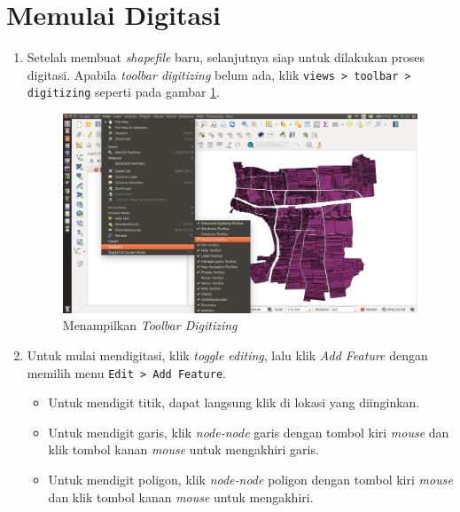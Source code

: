 \section{Memulai Digitasi}

\begin{enumerate}[1.]

  \item Setelah membuat \textit{shapefile} baru, selanjutnya siap untuk dilakukan proses digitasi. Apabila \textit{toolbar digitizing} belum ada, klik \texttt{views > toolbar > digitizing} seperti pada gambar \ref{fig:showdigitizingtoolbar}.
  
  \begin{figure}[H]
    \centering
    \includegraphics[width=1\textwidth]{./resources/049-show-digitizing-toolbar}
    \caption{Menampilkan \textit{Toolbar Digitizing}}
    \label{fig:showdigitizingtoolbar}
  \end{figure}
  
  \item Untuk mulai mendigitasi, klik \textit{toggle editing}, lalu klik \textit{Add Feature} dengan memilih menu \texttt{Edit > Add Feature}.
  
  \begin{itemize}
    \item Untuk mendigit titik, dapat langsung klik di lokasi yang diinginkan.
    \item Untuk mendigit garis, klik \textit{node-node} garis dengan tombol kiri \textit{mouse} dan klik tombol kanan \textit{mouse} untuk mengakhiri garis.
    \item Untuk mendigit poligon, klik \textit{node-node} poligon dengan tombol kiri \textit{mouse} dan klik tombol kanan \textit{mouse} untuk mengakhiri.
  \end{itemize}
  

\end{enumerate}
